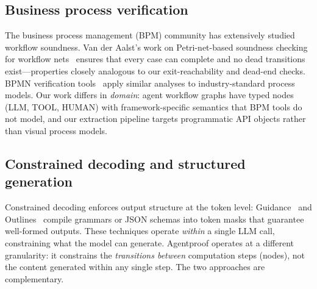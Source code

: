 \subsection{Business process verification}

The business process management (BPM) community has extensively studied
workflow soundness. Van der Aalst's work on Petri-net-based soundness
checking for workflow nets~\citep{vanderaalst2011bpm} ensures that
every case can complete and no dead transitions exist---properties
closely analogous to our exit-reachability and dead-end checks. BPMN
verification tools~\citep{dijkman2008bpmn} apply similar analyses to
industry-standard process models.
Our work differs in \emph{domain}: agent workflow graphs have typed
nodes (LLM, TOOL, HUMAN) with framework-specific semantics that BPM
tools do not model, and our extraction pipeline targets programmatic API
objects rather than visual process models.

\subsection{Constrained decoding and structured generation}

Constrained decoding enforces output structure at the token level:
Guidance~\citep{guidance2023} and Outlines~\citep{outlines2023} compile
grammars or JSON schemas into token masks that guarantee well-formed
outputs. These techniques operate \emph{within} a single LLM call,
constraining what the model can generate. Agentproof operates at a
different granularity: it constrains the \emph{transitions between}
computation steps (nodes), not the content generated within any single
step. The two approaches are complementary.
